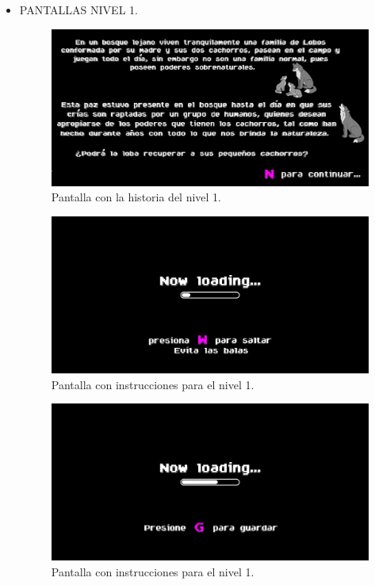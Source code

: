 \documentclass{article}
\begin{document}
\begin{itemize}
    \item PANTALLAS NIVEL 1.
        \begin{figure}[h]
        \includegraphics[scale=0.4]{Images/pantallahistoria.png}
        \centering
        \caption{Pantalla con la historia del nivel 1.}
        \label{fig:pantallahistoria1}
        \end{figure}
        
        \newpage
        \begin{figure}[h]
        \includegraphics[scale=0.4]{Images/pannivel1.png}
        \centering
        \caption{Pantalla con instrucciones para el nivel 1.}
        \label{fig:pantallainstruciones1}
        \end{figure}
        
        \begin{figure}[h]
        \includegraphics[scale=0.4]{Images/pannivel11.png}
        \centering
        \caption{Pantalla con instrucciones para el nivel 1.}
        \label{fig:pantallainstruciones11}
        \end{figure}
    

\end{itemize}
\end{document}
